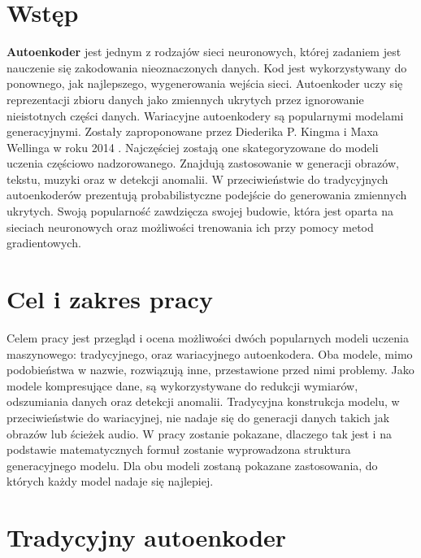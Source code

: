 \documentclass[a4paper,12pt,oneside]{book} %
\begin{document}
\sloppy

\thispagestyle{empty}



\tableofcontents{}

\chapter*{Wstęp} %
\textbf{Autoenkoder} jest jednym z rodzajów sieci neuronowych, której zadaniem jest nauczenie się zakodowania nieoznaczonych danych. Kod jest wykorzystywany do ponownego, jak najlepszego, wygenerowania wejścia sieci. Autoenkoder uczy się reprezentacji zbioru danych jako zmiennych ukrytych przez ignorowanie nieistotnych części danych.
Wariacyjne autoenkodery są popularnymi modelami generacyjnymi. Zostały zaproponowane przez Diederika P. Kingma i Maxa Wellinga w roku 2014 \cite{kingma2014autoencoding}. Najczęściej zostają one skategoryzowane do modeli uczenia częściowo nadzorowanego. Znajdują zastosowanie w generacji obrazów, tekstu, muzyki oraz w detekcji anomalii. W przeciwieństwie do tradycyjnych autoenkoderów prezentują probabilistyczne podejście do generowania zmiennych ukrytych. Swoją popularność zawdzięcza swojej budowie, która jest oparta na sieciach neuronowych oraz możliwości trenowania ich przy pomocy metod gradientowych.
\chapter*{Cel i zakres pracy}
Celem pracy jest przegląd i ocena możliwości dwóch popularnych modeli uczenia maszynowego: tradycyjnego, oraz wariacyjnego autoenkodera. Oba modele, mimo podobieństwa w nazwie, rozwiązują inne, przestawione przed nimi problemy. Jako modele kompresujące dane, są wykorzystywane do redukcji wymiarów, odszumiania danych oraz detekcji anomalii. Tradycyjna konstrukcja modelu, w przeciwieństwie do wariacyjnej, nie nadaje się do generacji danych takich jak obrazów lub ścieżek audio. W pracy zostanie pokazane, dlaczego tak jest i na podstawie matematycznych formuł zostanie wyprowadzona struktura generacyjnego modelu. Dla obu modeli zostaną pokazane zastosowania, do których każdy model nadaje się najlepiej.
\chapter{Tradycyjny autoenkoder}
\end{document}
